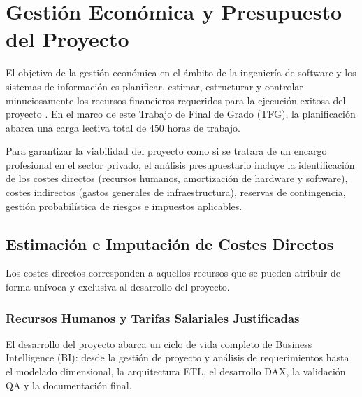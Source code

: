 \documentclass[12pt, a4paper, twoside]{report}
\begin{document}
\clearpage
{}

\tableofcontents %
\newpage
\listoftables    %

\clearpage
{}


\chapter{Gestión Económica y Presupuesto del Proyecto}

El objetivo de la gestión económica en el ámbito de la ingeniería de software y los sistemas de información es planificar, estimar, estructurar y controlar minuciosamente los recursos financieros requeridos para la ejecución exitosa del proyecto \cite{fib_costos}. En el marco de este Trabajo de Final de Grado (TFG), la planificación abarca una carga lectiva total de 450 horas de trabajo.

Para garantizar la viabilidad del proyecto como si se tratara de un encargo profesional en el sector privado, el análisis presupuestario incluye la identificación de los costes directos (recursos humanos, amortización de hardware y software), costes indirectos (gastos generales de infraestructura), reservas de contingencia, gestión probabilística de riesgos e impuestos aplicables.

\section{Estimación e Imputación de Costes Directos}
Los costes directos corresponden a aquellos recursos que se pueden atribuir de forma unívoca y exclusiva al desarrollo del proyecto.

\subsection{Recursos Humanos y Tarifas Salariales Justificadas}
El desarrollo del proyecto abarca un ciclo de vida completo de Business Intelligence (BI): desde la gestión de proyecto y análisis de requerimientos hasta el modelado dimensional, la arquitectura ETL, el desarrollo DAX, la validación QA y la documentación final. 
\end{document}
